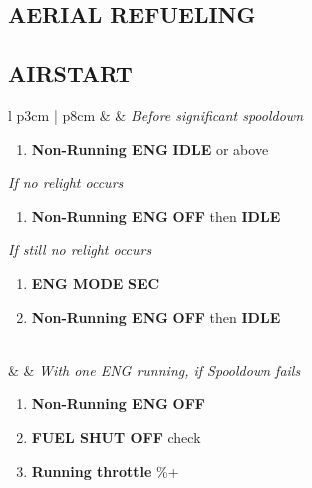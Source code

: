 \documentclass[fontHelvetica, widesubsec]{TechCheck}
\begin{document}
	\subsection{AERIAL REFUELING}

	\clearpage

	\subsection{AIRSTART}
	\begin{center}
		\begin{longtable}{l p{3cm} | p{8cm}}
			\toprule
			\textbf{\textbf{\textbullet}} &  & \emph{Before significant spooldown}
			\begin{minipage}[t]{\linewidth}
				\vspace{-7pt}
				\begin{enumerate}
					\item \textbf{Non-Running ENG} \dotfill \textbf{IDLE} or above
				\end{enumerate}
				\vspace{7pt}
				\emph{If no relight occurs}
				\begin{enumerate}[label=(\alph*), resume]
					\vspace{-7pt}
					\item \textbf{Non-Running ENG} \dotfill \textbf{OFF} then \textbf{IDLE}
				\end{enumerate}
				\vspace{-7pt}
				\emph{If still no relight occurs}
				\begin{enumerate}[label=(\alph*), resume]
					\vspace{-7pt}
					\item \textbf{ENG MODE} \dotfill \textbf{SEC}
					\item \textbf{Non-Running ENG} \dotfill \textbf{OFF} then \textbf{IDLE}
				\end{enumerate}
			\end{minipage} \\
			\midrule
			\textbf{\textbf{\textbullet}} &  &
			\emph{With one ENG running, if Spooldown fails}
			\begin{minipage}[t]{\linewidth}
				\vspace{-7pt}
				\begin{enumerate}
					\item \textbf{Non-Running ENG} \dotfill \textbf{OFF}
					\item \textbf{FUEL SHUT OFF} \dotfill check
					\item \textbf{Running throttle} \%+

\end{enumerate}
\end{minipage}
\end{longtable}
\end{center}
\end{document}
